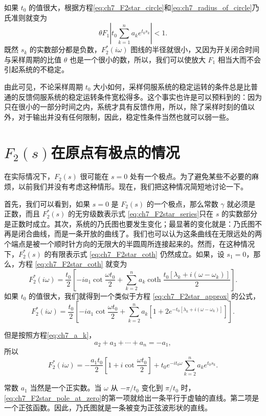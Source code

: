 如果 $t_0$ 的值很大，根据方程\eqref{eq:ch7_F2star_circle}和\eqref{eq:ch7_radius_of_circle}乃氏准则就变为
\begin{equation*}
\theta F_1 \left| t_0 \sum_{k=1}^n a_k e^{t_0 s_k} \right| < 1.
\end{equation*}
既然 $s_k$ 的实数部分都是负数，$F_2^* (i\omega)$ 图线的半径就很小，又因为开关闭合时间与采样周期的比值 $\theta$ 也是一个很小的数，所以，我们可以使放大 $F_1$ 相当大而不会引起系统的不稳定。

由此可见，不论采样周期 $t_0$ 大小如何，采样伺服系统的稳定运转的条件总是比普通的反馈伺服系统的稳定运转条件宽松得多。这个事实也许是可以预料到的：因为只在很小的一部分时间之内，系统才具有反馈作用，所以，除了采样时刻的值以外，对于输出并没有任何限制，因此，稳定性条件当然也就可以弱一些。

\section{$F_2(s)$在原点有极点的情况}

在实际情况下，$F_2(s)$ 很可能在 $s=0$ 处有一个极点。为了避免某些不必要的麻烦，以前我们并没有考虑这种情形。现在，我们把这种情况简短地讨论一下。

首先，我们可以看到，如果 $s=0$ 是 $F_2(s)$ 的一个极点，那么常数 $\gamma$ 就必须是正数，而且 $F_2^*(s)$ 的无穷级数表示式 \eqref{eq:ch7_F2star_series}只在 $s$ 的实数部分是正数时成立。其次，系统的乃氏图也要发生变化；最显著的变化就是：乃氏图不再是闭合曲线，而是一条开放的曲线了。我们也可以认为这条曲线在无限远处的两个端点是被一个顺时针方向的无限大的半圆周所连接起来的。然而，在这种情况下，$F_2^*(s)$ 的有限表示式 \eqref{eq:ch7_F2star_coth} 仍然成立。如果，设 $s_1=0$，那么，方程 \eqref{eq:ch7_F2star_coth} 就变为
\begin{equation*}
F_2^*(i\omega)=\frac{t_0}{2}\left[-ia_1\cot\frac{\omega t_0}{2}+\sum_{k=2}^n a_k\coth\frac{t_0[\lambda_k+i(\omega-\omega_k)]}{2}\right].
\end{equation*}
如果 $t_0$ 的值很大，我们就得到一个类似于方程 \eqref{eq:ch7_F2star_approx} 的公式，
\begin{equation*}
F_2^*(i\omega)=\frac{t_0}{2}\left[-ia_1\cot\frac{\omega t_0}{2}+\sum_{k=2}^n a_k\left[1+2e^{-t_0[\lambda_k+i(\omega-\omega_k)]}\right]\right].
\end{equation*}

但是按照方程\eqref{eq:ch7_a_k}，
\begin{equation*}
a_2+a_3+\cdots+a_n=-a_1,
\end{equation*}
所以
\begin{equation}\label{eq:ch7_F2star_pole_at_zero}
F_2^*(i\omega)=-\frac{a_1 t_0}{2}\left[1+i\cot\frac{\omega t_0}{2}\right]+t_0 e^{-it_0\omega}\sum_{k=2}^n a_k e^{t_0 s_k}.
\tag{7.21}
\end{equation}

常数 $a_1$ 当然是一个正实数。当 $\omega$ 从 $-\pi/t_0$ 变化到 $\pi/t_0$ 时，\eqref{eq:ch7_F2star_pole_at_zero}的第一项就给出一条平行于虚轴的直线。第二项是一个正弦函数。因此，乃氏图就是一条被变为正弦波形状的直线。

